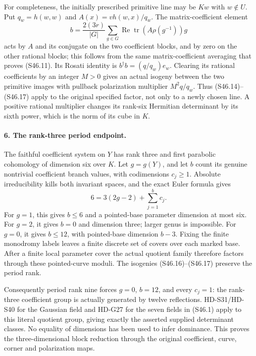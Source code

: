 For completeness, the initially prescribed primitive line
may be \(Kw\) with \(w\notin U\). Put \(q_w=h(w,w)\)
and \(A(x)=v h(w,x)/q_w\). The matrix-coefficient element
\[
 b=\frac{2(3r)}{|G|}\sum_{g\in G}
          \operatorname{Re}\operatorname{tr}
                   (A\rho(g^{-1}))g
 \tag{S46.17}
\]
acts by \(A\) and its conjugate on the two coefficient
blocks, and by zero on the other rational blocks; this follows
from the same matrix-coefficient averaging that proves
(S46.11). Its Rosati identity is
\(b^\dagger b=(q/q_w)e_w\). Clearing its rational
coefficients by an integer \(M>0\) gives an actual isogeny
between the two primitive images with pullback polarization
multiplier \(M^2q/q_w\). Thus (S46.14)--(S46.17) apply
to the original specified factor, not only to a newly chosen
line. A positive rational multiplier changes its rank-six
Hermitian determinant by its sixth power, which is the norm
of its cube in \(K\).

\paragraph{6. The rank-three period endpoint.}
The faithful coefficient system on \(Y\) has rank three
and first parabolic cohomology of dimension six over \(K\).
Let \(g=g(Y)\), and let \(b\) count its genuine nontrivial
coefficient branch values, with codimensions \(c_j\ge1\).
Absolute irreducibility kills both invariant spaces, and the
exact Euler formula gives
\[
                       6=3(2g-2)+\sum_{j=1}^b c_j.
 \tag{S46.18}
\]
For \(g=1\), this gives \(b\le6\) and a pointed-base
parameter dimension at most six. For \(g=2\), it gives
\(b=0\) and dimension three; larger genus is impossible.
For \(g=0\), it gives \(b\le12\), with pointed-base
dimension \(b-3\). Fixing the finite monodromy labels leaves
a finite discrete set of covers over each marked base. After
a finite local parameter cover the actual quotient family
therefore factors through these pointed-curve moduli. The
isogenies (S46.16)--(S46.17) preserve the period rank.

Consequently period rank nine forces \(g=0\), \(b=12\),
and every \(c_j=1\): the rank-three coefficient group is
actually generated by twelve reflections. HD-S31/HD-S40 for
the Gaussian field and HD-G27 for the seven fields in
(S46.1) apply to this literal quotient group, giving exactly
the asserted supplied determinant classes. No equality of
dimensions has been used to infer dominance. This proves the
three-dimensional block reduction through the original
coefficient, curve, corner and polarization maps.
